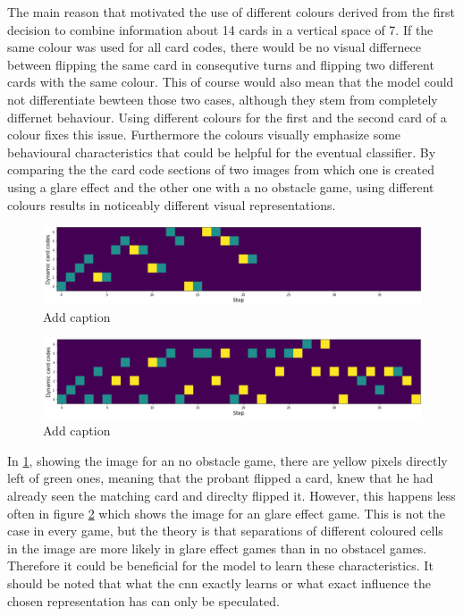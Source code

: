 The main reason that motivated the use of different colours derived from the first decision to combine information about 14 cards in a vertical space of 7. If the same colour was used for all card codes, there would be no visual differnece between flipping the same card in consequtive turns and flipping two different cards with the same colour. This of course would also mean that the model could not differentiate bewteen those two cases, although they stem from completely differnet behaviour. Using different colours for the first and the second card of a colour fixes this issue. Furthermore the colours visually emphasize some behavioural characteristics that could be helpful for the eventual classifier. By comparing the the card code sections of two images from which one is created using a glare effect and the other one with a no obstacle game, using different colours results in noticeably different visual representations. 
\begin{figure}[H]
	\centering
	\includegraphics[width=15cm]{images/cardCodesNoObst.png}
	\caption[Bild kurz]{Add caption}
	\label{fig:ccNo}
\end{figure}
\begin{figure}[H]
	\centering
	\includegraphics[width=15cm]{images/cardCodesGlare.png}
	\caption[Bild kurz]{Add caption}
	\label{fig:ccGlare}
\end{figure}
In \ref{fig:ccNo}, showing the image for an no obstacle game, there are yellow pixels directly left of green ones, meaning that the probant flipped a card, knew that he had already seen the matching card and direclty flipped it. However, this happens less often in figure \ref{fig:ccGlare} which shows the image for an glare effect game. This is not the case in every game, but the theory is that separations of different coloured cells in the image are more likely in glare effect games than in no obstacel games. Therefore it could be beneficial for the model to learn these characteristics. It should be noted that what the cnn exactly learns or what exact influence the chosen representation has can only be speculated. 

